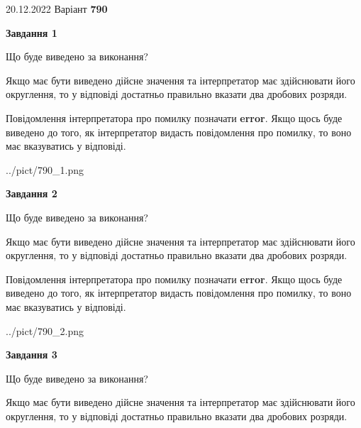 \documentclass[12pt, ukrainian]{article}
\begin{document}
{20.12.2022 Варіант \No \textbf { 790 }\par}
{
\begin {Large}

{\begin {center}\textbf{Завдання 1}\end {center}}\par
Що буде виведено за виконання? \par

Якщо має бути виведено дійсне значення та інтерпретатор має здійснювати його округлення, 
то у відповіді достатньо правильно вказати два дробових розряди.

Повідомлення інтерпретатора про помилку позначати \textbf{error}.
Якщо щось буде виведено до того, як інтерпретатор видасть повідомлення про помилку, 
то воно має вказуватись у відповіді. \par

\begin{center}
	{../pict/790_1.png}
\end{center}
\newpage

{\begin {center}\textbf{Завдання 2}\end {center}}\par
Що буде виведено за виконання? \par

Якщо має бути виведено дійсне значення та інтерпретатор має здійснювати його округлення, 
то у відповіді достатньо правильно вказати два дробових розряди.

Повідомлення інтерпретатора про помилку позначати \textbf{error}.
Якщо щось буде виведено до того, як інтерпретатор видасть повідомлення про помилку, 
то воно має вказуватись у відповіді. \par

\begin{center}
	{../pict/790_2.png}
\end{center}
\newpage

{\begin {center}\textbf{Завдання 3}\end {center}}\par
Що буде виведено за виконання? \par

Якщо має бути виведено дійсне значення та інтерпретатор має здійснювати його округлення, 
то у відповіді достатньо правильно вказати два дробових розряди.


\end{Large}}
\end{document}
